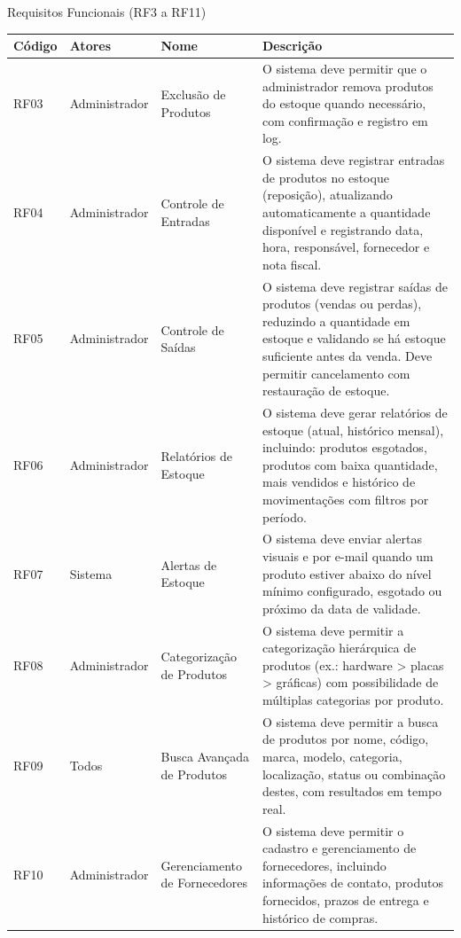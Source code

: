 \documentclass[
	12pt,				%
	openany,			%
	twoside,			%
	a4paper,			%
	english,			%
	brazil				%
	]{abntex2}
\begin{document}
\begin{quadro}[htb]
\caption{\label{quadro_rf2}Requisitos Funcionais (RF3 a RF11)}
\begin{tabular}{|p{1.4cm}|p{2.8cm}|p{4.5cm}|p{7.0cm}|}
    \hline
    \textbf{Código} & \textbf{Atores} & \textbf{Nome} & \textbf{Descrição} \\ \hline

      RF03 & Administrador & Exclusão de Produtos & O sistema deve permitir que o administrador remova produtos do estoque quando necessário, com confirmação e registro em log. \\ \hline


     RF04 & Administrador & Controle de Entradas & O sistema deve registrar entradas de produtos no estoque (reposição), atualizando automaticamente a quantidade disponível e registrando data, hora, responsável, fornecedor e nota fiscal. \\ \hline

    RF05 & Administrador & Controle de Saídas & O sistema deve registrar saídas de produtos (vendas ou perdas), reduzindo a quantidade em estoque e validando se há estoque suficiente antes da venda. Deve permitir cancelamento com restauração de estoque. \\ \hline

    RF06 & Administrador & Relatórios de Estoque & O sistema deve gerar relatórios de estoque (atual, histórico mensal), incluindo: produtos esgotados, produtos com baixa quantidade, mais vendidos e histórico de movimentações com filtros por período. \\ \hline

    RF07 & Sistema & Alertas de Estoque & O sistema deve enviar alertas visuais e por e-mail quando um produto estiver abaixo do nível mínimo configurado, esgotado ou próximo da data de validade. \\ \hline

    RF08 & Administrador & Categorização de Produtos & O sistema deve permitir a categorização hierárquica de produtos (ex.: hardware > placas > gráficas) com possibilidade de múltiplas categorias por produto. \\ \hline

    RF09 & Todos & Busca Avançada de Produtos & O sistema deve permitir a busca de produtos por nome, código, marca, modelo, categoria, localização, status ou combinação destes, com resultados em tempo real. \\ \hline

    RF10 & Administrador & Gerenciamento de Fornecedores & O sistema deve permitir o cadastro e gerenciamento de fornecedores, incluindo informações de contato, produtos fornecidos, prazos de entrega e histórico de compras. \\ \hline


\end{tabular}
\end{quadro}
\end{document}
